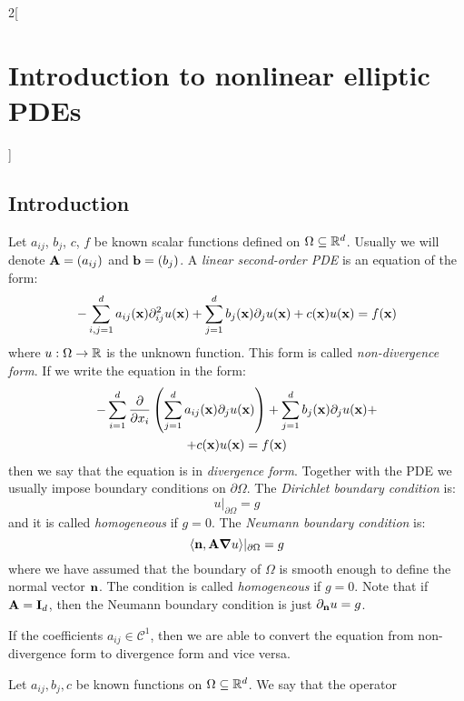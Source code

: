 \documentclass[../../../main_math.tex]{subfiles}
\begin{document}
\begin{multicols}{2}[\section{Introduction to nonlinear elliptic PDEs}]
  \subsection{Introduction}
  \begin{definition}
    Let $a_{ij}$, $b_j$, $c$, $f$ be known scalar functions defined on $\Omega\subseteq \mathbb{R}^d$. Usually we will denote $\boldsymbol{\mathrm{A}}=(a_{ij})$ and $\boldsymbol{\mathrm{b}}=(b_j)$. A \emph{linear second-order PDE} is an equation of the form:
    \begin{equation*}
      -\sum_{i,j=1}^da_{ij}(\boldsymbol{\mathrm{x}})\partial_{ij}^2u(\boldsymbol{\mathrm{x}})+\sum_{j=1}^db_j(\boldsymbol{\mathrm{x}})\partial_ju(\boldsymbol{\mathrm{x}})+c(\boldsymbol{\mathrm{x}})u(\boldsymbol{\mathrm{x}})=f(\boldsymbol{\mathrm{x}})
    \end{equation*}
    where $u:\Omega\to \mathbb{R}$ is the unknown function. This form is called \emph{non-divergence form}. If we write the equation in the form:
    \begin{multline*}
      -\sum_{i=1}^d\pdv{}{x_i}\left(\sum_{j=1}^da_{ij}(\boldsymbol{\mathrm{x}})\partial_ju(\boldsymbol{\mathrm{x}})\right)+\sum_{j=1}^db_j(\boldsymbol{\mathrm{x}})\partial_ju(\boldsymbol{\mathrm{x}})+\\+c(\boldsymbol{\mathrm{x}})u(\boldsymbol{\mathrm{x}})=f(\boldsymbol{\mathrm{x}})
    \end{multline*}
    then we say that the equation is in \emph{divergence form}. Together with the PDE we usually impose boundary conditions on $\partial\Omega$. The \emph{Dirichlet boundary condition} is:
    $$
      u|_{\partial\Omega}=g
    $$
    and it is called \emph{homogeneous} if $g=0$. The \emph{Neumann boundary condition} is:
    $$
      \langle \boldsymbol{\mathrm{n}},\boldsymbol{\mathrm{A}} \grad u\rangle|_{\partial\Omega}=g
    $$
    where we have assumed that the boundary of $\Omega$ is smooth enough to define the normal vector $\boldsymbol{\mathrm{n}}$. The condition is called \emph{homogeneous} if $g=0$. Note that if $\boldsymbol{\mathrm{A}}=\boldsymbol{\mathrm{I}}_d$, then the Neumann boundary condition is just $\partial_{\boldsymbol{\mathrm{n}}} u=g$.
  \end{definition}
  \begin{remark}
    If the coefficients $a_{ij}\in\mathcal{C}^1$, then we are able to convert the equation from non-divergence form to divergence form and vice versa.
  \end{remark}
  \begin{definition}
    Let $a_{ij},b_j,c$ be known functions on $\Omega\subseteq \mathbb{R}^d$. We say that the operator

\end{definition}
\end{multicols}
\end{document}
